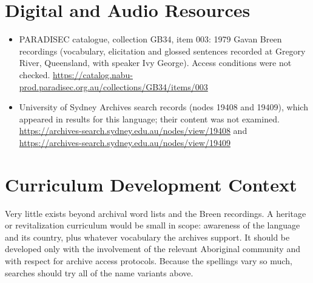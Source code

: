 \documentclass[12pt]{article}
\begin{document}
\section{Digital and Audio Resources}
\begin{itemize}
\item PARADISEC catalogue, collection GB34, item 003: 1979 Gavan Breen recordings (vocabulary, elicitation and glossed sentences recorded at Gregory River, Queensland, with speaker Ivy George). Access conditions were not checked. \url{https://catalog.nabu-prod.paradisec.org.au/collections/GB34/items/003}
\item University of Sydney Archives search records (nodes 19408 and 19409), which appeared in results for this language; their content was not examined. \url{https://archives-search.sydney.edu.au/nodes/view/19408} and \url{https://archives-search.sydney.edu.au/nodes/view/19409}
\end{itemize}

\section{Curriculum Development Context}
Very little exists beyond archival word lists and the Breen recordings. A heritage or revitalization curriculum would be small in scope: awareness of the language and its country, plus whatever vocabulary the archives support. It should be developed only with the involvement of the relevant Aboriginal community and with respect for archive access protocols. Because the spellings vary so much, searches should try all of the name variants above.
\end{document}
